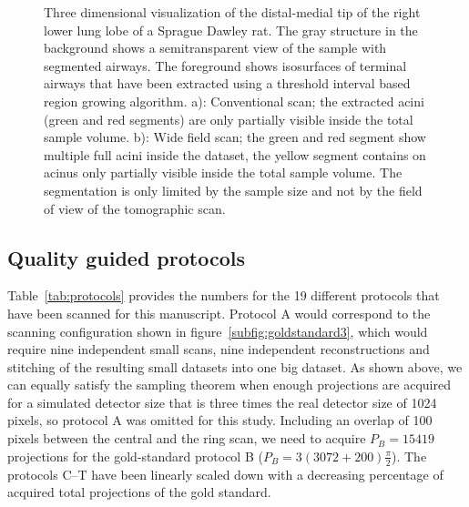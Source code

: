 \begin{figure}[htp]
{%
		}%
		\caption{Three dimensional visualization of the distal-medial tip of the right lower lung lobe of a Sprague Dawley rat. The gray structure in the background shows a semitransparent view of the sample with segmented airways. The foreground shows isosurfaces of terminal airways that have been extracted using a threshold interval based region growing algorithm. a): Conventional scan; the extracted acini (green and red segments) are only partially visible inside the total sample volume. b): Wide field scan; the green and red segment show multiple full acini inside the dataset, the yellow segment contains on acinus only partially visible inside the total sample volume. The segmentation is only limited by the sample size and not by the field of view of the tomographic scan.}%
		\label{fig:s2-wfs}%
	\end{figure}
\fi

\subsection{Quality guided protocols}%
Table~\ref{tab:protocols} provides the numbers for the 19 different protocols that have been scanned for this manuscript. Protocol A would correspond to the scanning configuration shown in figure~\ref{subfig:goldstandard3}, which would require nine independent small scans, nine independent reconstructions and stitching of the resulting small datasets into one big dataset. As shown above, we can equally satisfy the sampling theorem when enough projections are acquired for a simulated detector size that is three times the real detector size of 1024 pixels, so protocol A was omitted for this study. Including an overlap of 100 pixels between the central and the ring scan, we need to acquire $P_{B}=15419$ projections for the gold-standard protocol B ($P_{B}=3(3072+200)\frac{\pi}{2}$). The protocols C--T have been linearly scaled down with a decreasing percentage of acquired total projections of the gold standard.

